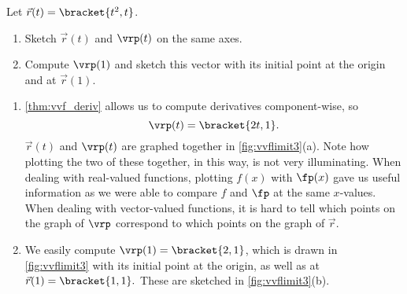 \begin{example}\label{ex_vvflimit3}%
Let $\vec r(t) =\bracket{t^2,t}$. 
\begin{enumerate}
	\item Sketch $\vec r(t)$ and $\vrp(t)$ on the same axes.
	\item	Compute $\vrp(1)$ and sketch this vector with its initial point at the origin and at $\vec r(1)$.
\end{enumerate}
\solution
\begin{enumerate}
\item	\autoref{thm:vvf_deriv} allows us to compute derivatives component-wise, so
\[\vrp(t) =\bracket{2t, 1}.\]
$\vec r(t)$ and $\vrp(t)$ are graphed together in \autoref{fig:vvflimit3}(a). Note how plotting the two of these together, in this way, is not very illuminating. When dealing with real-valued functions, plotting $f(x)$ with $\fp(x)$ gave us useful information as we were able to compare $f$ and $\fp$ at the same $x$-values. When dealing with vector-valued functions, it is hard to tell which points on the graph of $\vrp$ correspond to which points on the graph of $\vec r$.

\item	We easily compute $\vrp(1) =\bracket{2,1}$, which is drawn in \autoref{fig:vvflimit3} with its initial point at the origin, as well as at $\vec r(1) =\bracket{1,1}.$ These are sketched in \autoref{fig:vvflimit3}(b).
\end{enumerate}
\end{example}

\iftoggle{in_threeD}{%
\mtable{Viewing a vector-valued function and its derivative at one point.}{fig:vvflimit4}{%
\myincludeasythree{
3Droll=-0.5856992334166129,
3Dortho=0.004399999976158142,
3Dc2c=0.6354137063026428 0.6317671537399292 0.4439816176891327,
3Dcoo=-18.837804794311523 -8.740551948547363 60.22870635986328,
3Droo=150.0000027221829}{.7\marginparwidth}{Helix r (t) = ⟨cos t, sin t, t⟩ (blue) through origin; red arrow r′ (7pi/4) is tangent of length sqtr of 2 at that point.}{figures/figvvflimit4_3D}}%
}{%
\mtable[-3\baselineskip]{Viewing a vector-valued function and its derivative at one point, from two different perspectives.}{fig:vvflimit4}{%
\myincludegraphics[alt={Helix r (t) = ⟨cos t, sin t, t⟩ (blue) through origin; red arrow r′ (7pi/4) is tangent of length sqrt of 2 at that point.},width=.7\marginparwidth]{figures/figvvflimit4_3D}
\\(a)\\
\myincludegraphics[alt={Space-curve r (t)=⟨t, 1–t^2, t^2⟩ (blue) and red tangent line through point r(0)=⟨0,1,0⟩; axes ticked +/-2.},,width=.7\marginparwidth]{figures/figvvflimit4a_3D}
\\(b)}%
}%

